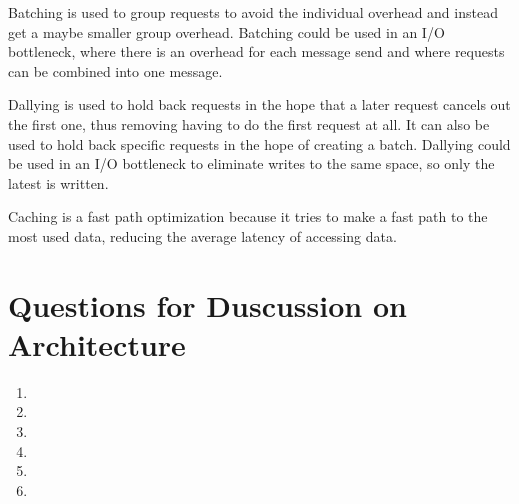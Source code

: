 \documentclass[a4paper, 11pt]{article}
\begin{document}
Batching is used to group requests to avoid the individual overhead and instead get a maybe smaller group overhead. Batching could be used in an I/O bottleneck, where there is an overhead for each message send and where requests can be combined into one message.

Dallying is used to hold back requests in the hope that a later request cancels out the first one, thus removing having to do the first request at all. It can also be used to hold back specific requests in the hope of creating a batch. Dallying could be used in an I/O bottleneck to eliminate writes to the same space, so only the latest is written.

Caching is a fast path optimization because it tries to make a fast path to the most used data, reducing the average latency of accessing data.


\section{Questions for Duscussion on Architecture} %
\label{sec:questions_for_duscussion_on_architecture}

\begin{enumerate}
    \item 
    \item
    \item
    \item
    \item
    \item
\end{enumerate}

\end{document}
